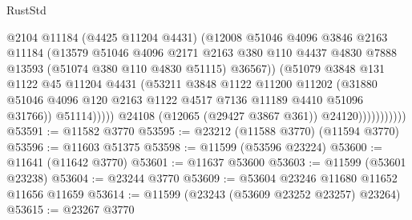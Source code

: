\begin{lexlean}{RustStd}
\begin{coremodule}
                                  @2104
                                  @11184
                                  (@4425 @11204 @4431)
                                  (@12008
                                    @51046
                                    @4096
                                    @3846
                                    @2163
                                    @11184
                                    (@13579
                                      @51046
                                      @4096
                                      @2171
                                      @2163
                                      @380
                                      @110
                                      @4437
                                      @4830
                                      @7888
                                      @13593
                                      (@51074 @380 @110 @4830 @51115)
                                      @36567))
                                  (@51079
                                    @3848
                                    @131
                                    @1122
                                    @45
                                    @11204
                                    @4431
                                    (@53211
                                      @3848
                                      @1122
                                      @11200
                                      @11202
                                      (@31880
                                        @51046
                                        @4096
                                        @120
                                        @2163
                                        @1122
                                        @4517
                                        @7136
                                        @11189
                                        @4410
                                        @51096
                                        @31766))
                                    @51114)))))
                          @24108
                          (@12065 (@29427 @3867 @361))
                          @24120)))))))))))
@53591 := @11582 @3770
@53595 := @23212 (@11588 @3770) (@11594 @3770)
@53596 := @11603 @51375
@53598 := @11599 (@53596 @23224)
@53600 := @11641 (@11642 @3770)
@53601 := @11637 @53600
@53603 := @11599 (@53601 @23238)
@53604 := @23244 @3770
@53609 := @53604 @23246 @11680 @11652 @11656 @11659
@53614 := @11599 (@23243 (@53609 @23252 @23257) @23264)
@53615 := @23267 @3770

\end{coremodule}
\end{lexlean}
